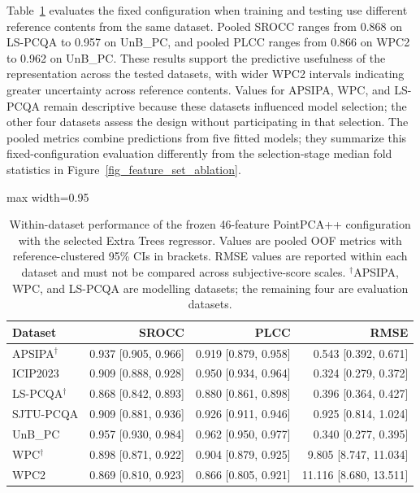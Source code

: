 \documentclass[final,3p,times,twocolumn]{elsarticle}
\begin{document}
Table~\ref{tab_pointpcapp_all_datasets} evaluates the fixed configuration when training and testing use different reference contents from the same dataset. Pooled \gls{SROCC} ranges from 0.868 on LS-PCQA to 0.957 on UnB\_PC, and pooled \gls{PLCC} ranges from 0.866 on WPC2 to 0.962 on UnB\_PC. These results support the predictive usefulness of the representation across the tested datasets, with wider WPC2 intervals indicating greater uncertainty across reference contents. Values for APSIPA, WPC, and LS-PCQA remain descriptive because these datasets influenced model selection; the other four datasets assess the design without participating in that selection. The pooled metrics combine predictions from five fitted models; they summarize this fixed-configuration evaluation differently from the selection-stage median fold statistics in Figure~\ref{fig_feature_set_ablation}.

\begin{table}[ht!]
    \centering
    \caption{Within-dataset performance of the frozen 46-feature PointPCA++ configuration with the selected Extra Trees regressor. Values are pooled \gls{OOF} metrics with reference-clustered 95\% \glspl{CI} in brackets. RMSE values are reported within each dataset and must not be compared across subjective-score scales. $^{\dagger}$APSIPA, WPC, and LS-PCQA are modelling datasets; the remaining four are evaluation datasets.}
    \label{tab_pointpcapp_all_datasets}
    \scriptsize
    \begin{adjustbox}{max width=0.95\columnwidth}
    \begin{tabular}{lrrr}
        \toprule
        Dataset & \gls{SROCC} & \gls{PLCC} & \gls{RMSE} \\
        \midrule

        APSIPA$^{\dagger}$ & 0.937 [0.905, 0.966] & 0.919 [0.879, 0.958] & 0.543 [0.392, 0.671] \\
        ICIP2023 & 0.909 [0.888, 0.928] & 0.950 [0.934, 0.964] & 0.324 [0.279, 0.372] \\
        LS-PCQA$^{\dagger}$ & 0.868 [0.842, 0.893] & 0.880 [0.861, 0.898] & 0.396 [0.364, 0.427] \\
        SJTU-PCQA & 0.909 [0.881, 0.936] & 0.926 [0.911, 0.946] & 0.925 [0.814, 1.024] \\
        UnB\_PC & 0.957 [0.930, 0.984] & 0.962 [0.950, 0.977] & 0.340 [0.277, 0.395] \\
        WPC$^{\dagger}$ & 0.898 [0.871, 0.922] & 0.904 [0.879, 0.925] & 9.805 [8.747, 11.034] \\
        WPC2 & 0.869 [0.810, 0.923] & 0.866 [0.805, 0.921] & 11.116 [8.680, 13.511] \\
        \bottomrule

    \end{tabular}
    \end{adjustbox}
\end{table}
\end{document}
